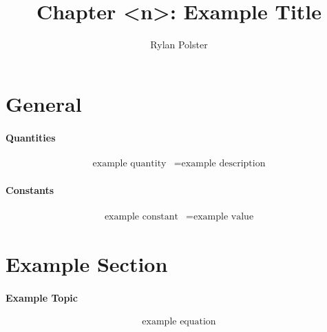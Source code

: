 \documentclass{article}
\title{Chapter <n>: Example Title}
\author{Rylan Polster}
\begin{document}
    \maketitle
    
    \section*{General}

        \paragraph{Quantities}
        \begin{align}
            \text{example quantity} &= \text{example description} \nonumber
        \end{align}

        \paragraph{Constants}
        \begin{align}
            \text{example constant} &= \text{example value} \nonumber
        \end{align}

    \section{Example Section}

        \paragraph{Example Topic}
        \begin{equation}
            \text{example equation}
        \end{equation}
\end{document}
